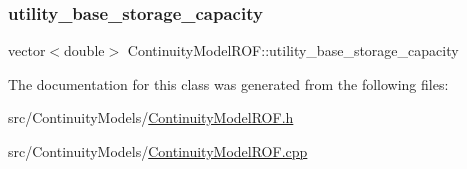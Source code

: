\subsubsection{\texorpdfstring{utility\+\_\+base\+\_\+storage\+\_\+capacity}{utility\_base\_storage\_capacity}}
{\footnotesize\ttfamily vector$<$double$>$ Continuity\+Model\+R\+O\+F\+::utility\+\_\+base\+\_\+storage\+\_\+capacity\hspace{0.3cm}{\ttfamily [protected]}}



The documentation for this class was generated from the following files\+:\begin{DoxyCompactItemize}
\item 
src/\+Continuity\+Models/\mbox{\hyperlink{ContinuityModelROF_8h}{Continuity\+Model\+R\+O\+F.\+h}}\item 
src/\+Continuity\+Models/\mbox{\hyperlink{ContinuityModelROF_8cpp}{Continuity\+Model\+R\+O\+F.\+cpp}}\end{DoxyCompactItemize}
